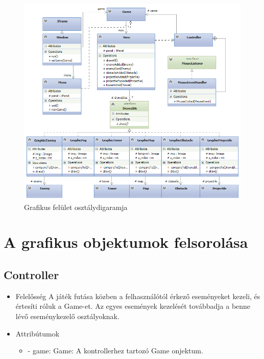\begin{figure}[H]
\begin{center}
\includegraphics[width=18cm]{images/ch11/very_final_uml_doge_diagram.png}
\caption{Grafikus felület osztálydigaramja}
\label{fig:Graphic_class_diag}
\end{center}
\end{figure}

\pagebreak
\section{A grafikus objektumok felsorolása}

\subsection{Controller}
\begin{itemize}
\item Felelősség \newline
A játék futása közben a felhasználótól érkező eseményeket kezeli, és értesíti róluk a Game-et. Az egyes események kezelését továbbadja a benne lévő eseménykezelő osztályoknak.
\item Attribútumok
	\begin{itemize}
		\item - game: Game: A kontrollerhez tartozó Game onjektum.
	\end{itemize}
\end{itemize}

